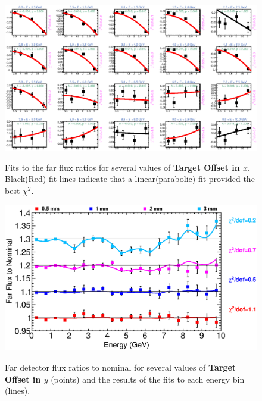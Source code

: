 \begin{figure}[ht]
  \begin{center}
    {\includegraphics[width=5.0in]{figures/TargetXOffset_far_fits.eps}}
  \end{center}
\caption{ Fits to the far flux ratios for several values of {\bf Target Offset in $x$}. Black(Red) fit lines indicate that a linear(parabolic) fit provided the best $\chi^2$. }
\end{figure}

\begin{figure}[ht]
  \begin{center}
    {\includegraphics[width=6.0in]{figures/TargetYOffset_far_summary.eps}}
  \end{center}
\caption{ Far detector flux ratios to nominal for several values of {\bf Target Offset in $y$} (points) and the results of the fits to each energy bin (lines).}
\end{figure}

